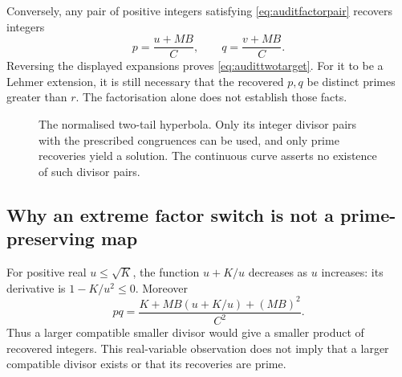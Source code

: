 Conversely, any pair of positive integers satisfying
\eqref{eq:auditfactorpair} recovers integers
\begin{equation}\label{eq:auditrecover}
 p=\frac{u+MB}{C},\qquad q=\frac{v+MB}{C}.
\end{equation}
Reversing the displayed expansions proves
\eqref{eq:audittwotarget}. For it to be a Lehmer extension, it is
still necessary that the recovered $p,q$ be distinct primes greater
than $r$. The factorisation alone does not establish those facts.

\begin{figure}[tbp]
\centering
{}
\caption{The normalised two-tail hyperbola. Only its integer divisor
pairs with the prescribed congruences can be used, and only prime
recoveries yield a solution. The continuous curve asserts no existence
of such divisor pairs.}
\label{fig:audithyperbola}
\end{figure}

\subsection{Why an extreme factor switch is not a prime-preserving map}
For positive real $u\le\sqrt K$, the function $u+K/u$ decreases as
$u$ increases: its derivative is $1-K/u^2\le0$. Moreover
\begin{equation}\label{eq:auditproduct}
 pq=\frac{K+MB(u+K/u)+(MB)^2}{C^2}.
\end{equation}
Thus a larger compatible smaller divisor would give a smaller product
of recovered integers. This real-variable observation does not imply
that a larger compatible divisor exists or that its recoveries are prime.

